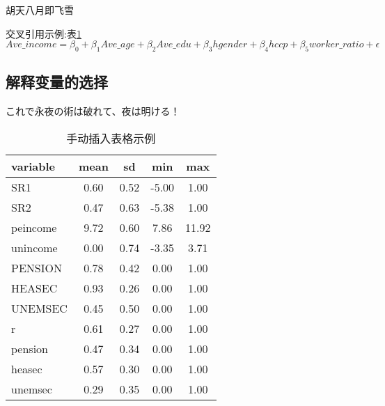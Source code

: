 胡天八月即飞雪

交叉引用示例:表\ref{hhh}
\begin{equation*}
    Ave\_income = \beta_0 + \beta_{1}Ave\_age + \beta_{2}Ave\_edu + \beta_{3}hgender + \beta_{4}hccp + \beta_{5}worker\_ratio + \epsilon
\end{equation*}


\subsection{解释变量的选择}
これで永夜の術は破れて、夜は明ける！
\begin{table}

    \small
    \caption{手动插入表格示例}
    \centering
    \begin{tabular}{lcccc}
        \toprule[1.5bp]
        variable & mean & sd   & min   & max   \\
        \midrule[0.75bp]
        SR1      & 0.60 & 0.52 & -5.00 & 1.00  \\
        SR2      & 0.47 & 0.63 & -5.38 & 1.00  \\
        peincome & 9.72 & 0.60 & 7.86  & 11.92 \\
        unincome & 0.00 & 0.74 & -3.35 & 3.71  \\
        PENSION  & 0.78 & 0.42 & 0.00  & 1.00  \\
        HEASEC   & 0.93 & 0.26 & 0.00  & 1.00  \\
        UNEMSEC  & 0.45 & 0.50 & 0.00  & 1.00  \\
        r        & 0.61 & 0.27 & 0.00  & 1.00  \\
        pension  & 0.47 & 0.34 & 0.00  & 1.00  \\
        heasec   & 0.57 & 0.30 & 0.00  & 1.00  \\
        unemsec  & 0.29 & 0.35 & 0.00  & 1.00  \\
        \bottomrule[1.5bp]
    \end{tabular}
    \label{hhh}
    \vspace{22bp}
\end{table}
